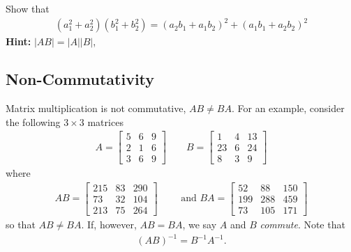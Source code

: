 \begin{homework}
	Show that 
	\begin{align}
		\left(a_1^2 + a_2^2\right)\left(b_1^2 + b_2^2\right) = \left(a_2 b_1 + a_1 b_2\right)^2 + \left(a_1 b_1 + a_2 b_2\right)^2
	\end{align}
	\textbf{Hint:}  $|A B | = |A| |B|$, 
\end{homework}

\subsection{Non-Commutativity}

Matrix multiplication is not commutative, \ie $AB \neq BA$. For an example, consider the following $3\times3$ matrices
%
\begin{align}
	A = \begin{bmatrix}
	5 & 6 & 9 \\
	2 & 1  & 6 \\
	3 & 6 & 9
	\end{bmatrix} 
	\qquad 
	B = \begin{bmatrix}
	1   &  4  &  13 \\
	23  &   6  &  24 \\
	8   &  3    & 9
	\end{bmatrix} 
\end{align}
%
where
%
\begin{align}
	AB = \begin{bmatrix}
	215  &  83 &  290 \\
	73  &  32 &  104 \\
	213  &  75 &  264
	\end{bmatrix} 
	\qquad
	\text{ and }
	BA = \begin{bmatrix}
	52   & 88  & 150 \\
	199 &  288 &  459 \\
	73 &  105 &  171
	\end{bmatrix} 
\end{align}
%
so that $AB \neq BA$. If, however, $AB = BA$, we say $A$ and $B$ \textit{commute}. Note that 
%
\begin{align}
	(AB)^{-1} = B^{-1} A^{-1}.
\end{align}

